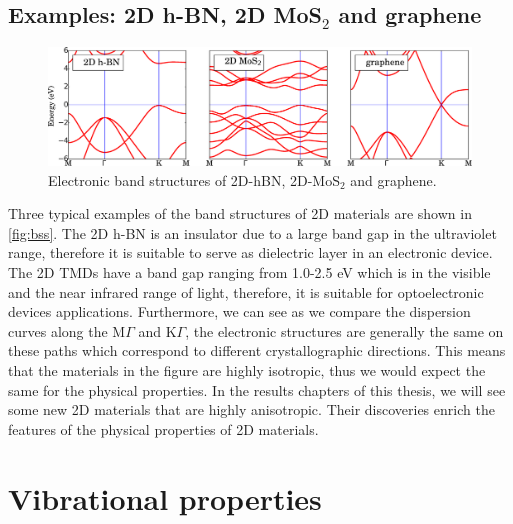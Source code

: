 \subsection{Examples: 2D h-BN, 2D MoS$_2$ and graphene}
\begin{figure}[htbp!] 
\centering  
\includegraphics[width=\textwidth]{bss.eps}
\caption{Electronic band structures of 2D-hBN, 2D-MoS$_2$ and graphene. }  
\label{fig:bss}
\end{figure} 
Three typical examples of the band structures of 2D materials are shown in \autoref{fig:bss}. The 2D h-BN is an insulator due to a large band gap in the ultraviolet range, therefore it is suitable to serve as dielectric layer in an electronic device. The 2D TMDs have a band gap ranging from 1.0-2.5 eV which is in the visible and the near infrared range of light, therefore, it is suitable for optoelectronic devices applications. Furthermore, we can see as we compare the dispersion curves along the M$\Gamma$ and K$\Gamma$, the electronic structures are generally the same on these paths which correspond to different crystallographic directions. This means that the materials in the figure are highly isotropic, thus we would expect the same for the physical properties. In the results chapters of this thesis, we will see some new 2D materials that are highly anisotropic. Their discoveries enrich the features of the physical properties of 2D materials.

\section{Vibrational properties}

